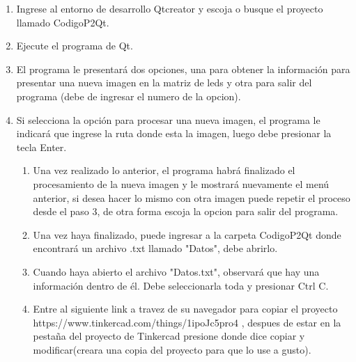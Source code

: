 \documentclass{article}
\begin{document}
  \begin{enumerate}
        \item Ingrese al entorno de desarrollo Qtcreator y escoja o busque el proyecto llamado CodigoP2Qt.\\
        
         \item Ejecute el programa de Qt.\\ 
         
         \item El programa le presentará dos opciones, una para obtener la información para presentar una nueva imagen en la matriz de leds y otra para salir del programa (debe de ingresar el numero de la opcion).\\
         
         \item Si selecciona la opción para procesar una nueva imagen, el programa le indicará que ingrese la ruta donde esta la imagen, luego debe presionar la tecla Enter.\\
         
         \begin{enumerate}
         
         \item Una vez realizado lo anterior, el programa habrá finalizado el procesamiento de la nueva imagen y le mostrará nuevamente el menú anterior, si desea hacer lo mismo con otra imagen puede repetir el proceso desde el paso 3, de otra forma escoja la opcion para salir del programa.\\
    
        \item Una vez haya finalizado, puede ingresar a la carpeta CodigoP2Qt donde encontrará un archivo .txt llamado "Datos", debe abrirlo.\\
        
        \item Cuando haya abierto el archivo "Datos.txt",  observará que hay una información dentro de él. Debe seleccionarla toda y presionar Ctrl C.\\ 
        
        \item Entre al siguiente link a travez de su navegador para copiar el proyecto https://www.tinkercad.com/things/1ipoJc5pro4 , despues de estar en la pestaña del proyecto de Tinkercad presione donde dice copiar y modificar(creara una copia del proyecto para que lo use a gusto).\\


\end{enumerate}
\end{enumerate}
\end{document}
